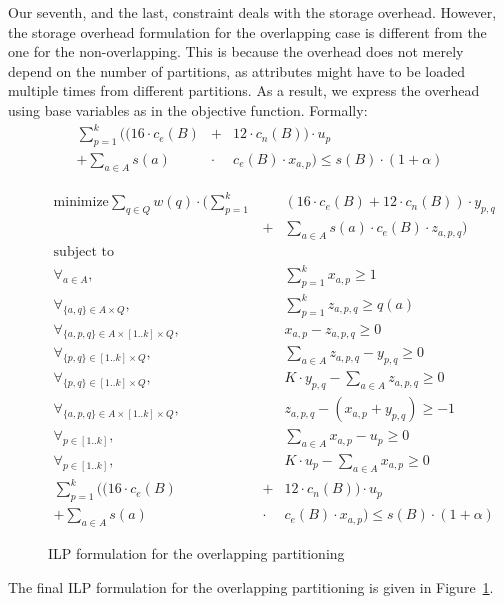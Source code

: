 Our seventh, and the last, constraint deals with the storage overhead. However,
the storage overhead formulation for the overlapping case is different from 
the one for the non-overlapping. This is because the overhead does not merely
depend on the number of partitions, as attributes might have to be loaded
multiple times from different partitions. As a result, we express the overhead
using base variables as in the objective function. Formally:
\begin{eqnarray}
\sum_{p=1}^{k} \Big((16\cdot c_e(B) &+& 12 \cdot c_n(B)) \cdot u_p  \nonumber \\ 
+ \sum_{a\in A} s(a) \!\!&\cdot&\!\! c_e(B)\cdot x_{a,p} \Big) \leq s(B)\cdot (1+\alpha)
\end{eqnarray}

\begin{figure}[!t]
\begin{eqnarray}
\text{minimize}  
    \sum_{q\in Q} w(q)\cdot \Big(\sum_{p=1}^{k} \!\!&&\!\! (16\cdot c_e(B) + 12\cdot c_n(B))\cdot y_{p,q}\nonumber\\
    &+& \sum_{a\in A} s(a)\cdot c_e(B)\cdot z_{a,p,q} \Big) \nonumber\\
\text{subject to}&&\nonumber\\
\forall_{a\in A}, 
    && \sum_{p=1}^{k} x_{a,p} \geq 1\nonumber\\
\forall_{\{a,q\}\in A\times Q},
    &&  \sum_{p=1}^{k} z_{a,p,q} \geq q(a) \nonumber\\
\forall_{\{a,p,q\}\in A\times [1..k]\times Q}, 
    && x_{a,p} - z_{a,p,q} \geq 0 \nonumber\\
\forall_{\{p,q\}\in [1..k]\times Q}, 
    &&  \sum_{a\in A} z_{a,p,q} - y_{p,q} \geq 0 \nonumber\\
\forall_{\{p,q\}\in [1..k]\times Q}, 
    &&  K\cdot y_{p,q} - \sum_{a\in A} z_{a,p,q}  \geq 0 \nonumber\\
\forall_{\{a,p,q\}\in A\times [1..k]\times Q}, 
    && z_{a,p,q} - (x_{a,p} + y_{p,q}) \geq -1 \nonumber\\
\forall_{p\in[1..k]},
    && \sum_{a\in A} x_{a,p} - u_p \geq 0 \nonumber\\
\forall_{p\in[1..k]},
    && K\cdot u_p - \sum_{a\in A} x_{a,p} \geq 0 \nonumber\\    
\sum_{p=1}^{k} \Big((16\cdot c_e(B) &+& 12 \cdot c_n(B)) \cdot u_p  \nonumber \\ 
+ \sum_{a\in A} s(a) \!\!&\cdot&\!\! c_e(B)\cdot x_{a,p}  \Big)\leq s(B)\cdot (1+\alpha)\nonumber
\end{eqnarray}
\caption{ILP formulation for the overlapping partitioning}
\label{fig:ov-ilp}
\end{figure}

The final ILP formulation for the overlapping partitioning is given in
Figure~\ref{fig:ov-ilp}.


